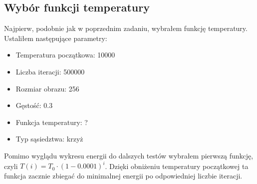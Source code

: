 \subsection{Wybór funkcji temperatury}
Najpierw, podobnie jak w poprzednim zadaniu, wybrałem funkcję temperatury.
Ustaliłem następujące parametry:
\begin{itemize}
    \item Temperatura początkowa: 10000
    \item Liczba iteracji: 500000
    \item Rozmiar obrazu: 256
    \item Gęstość: 0.3
    \item Funkcja temperatury: ?
    \item Typ sąsiedztwa: krzyż 
\end{itemize}


Pomimo wyglądu wykresu energii do dalszych testów wybrałem pierwszą funkcję, czyli
$T(i) = T_0\cdot(1-0.0001)^{i}$. Dzięki obniżeniu temperatury początkowej ta funkcja zacznie zbiegać do minimalnej energii po odpowiedniej liczbie iteracji.


